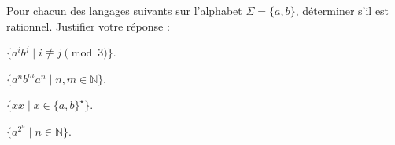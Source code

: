 
\begingroup

\begin{exercice} \label{exo:lexing/expressiveness/revision}

  Pour chacun des langages suivants sur l’alphabet $\Sigma = \{a,b\}$,
  déterminer s’il est rationnel. Justifier votre réponse :

  \begin{questions}

  \item $\{ a^i b^j \mid i \not\equiv j \pmod{3} \}$.
  
  \item $\{ a^n b^m a^n \mid n,m \in \mathbb{N} \}$.
  
  \item $\{ xx \mid x \in \{a,b\}^\star \}$.

  \item $\{ a^{2^n} \mid n \in \mathbb{N} \}$.

  \end{questions}

\end{exercice}

